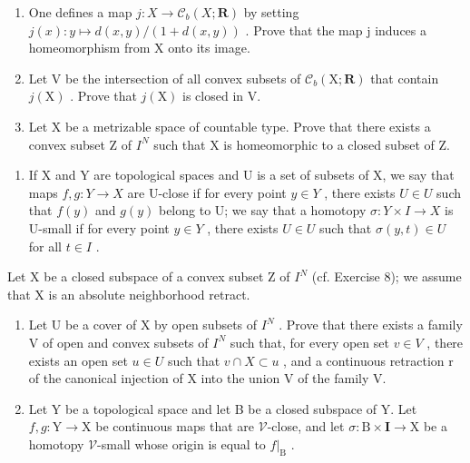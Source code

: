 \begin{enumerate}
\def\labelenumi{\alph{enumi})}
\item
  One defines a map \(j\colon X \to \mathcal{C}_{b}(X; \mathbf{R})\) by setting \(j(x)\colon y \mapsto d(x, y)/(1 + d(x, y))\) . Prove that the map j induces a homeomorphism from X onto its image.
\item
  Let V be the intersection of all convex subsets of \(\mathcal{C}_{b}(\mathrm{X};\mathbf{R})\) that contain \(j(\mathrm{X})\) . Prove that \(j(\mathrm{X})\) is closed in V.
\item
  Let X be a metrizable space of countable type. Prove that there exists a convex subset Z of \(I^{N}\) such that X is homeomorphic to a closed subset of Z.
\end{enumerate}

\begin{enumerate}
\def\labelenumi{\arabic{enumi})}
\setcounter{enumi}{8}
\tightlist
\item
  If X and Y are topological spaces and U is a set of subsets of X, we say that maps \(f, g: Y \to X\) are U-close if for every point \(y \in Y\) , there exists \(U \in U\) such that \(f(y)\) and \(g(y)\) belong to U; we say that a homotopy \(\sigma: Y \times I \to X\) is U-small if for every point \(y \in Y\) , there exists \(U \in U\) such that \(\sigma(y, t) \in U\) for all \(t \in I\) .
\end{enumerate}

Let X be a closed subspace of a convex subset Z of \(I^{N}\) (cf. Exercise 8); we assume that X is an absolute neighborhood retract.

\begin{enumerate}
\def\labelenumi{\alph{enumi})}
\item
  Let U be a cover of X by open subsets of \(I^{N}\) . Prove that there exists a family V of open and convex subsets of \(I^{N}\) such that, for every open set \(v \in V\) , there exists an open set \(u \in U\) such that \(v \cap X \subset u\) , and a continuous retraction r of the canonical injection of X into the union V of the family V.
\item
  Let Y be a topological space and let B be a closed subspace of Y. Let \(f, g: \mathrm{Y} \to \mathrm{X}\) be continuous maps that are \(\mathcal{V}\)-close, and let \(\sigma: \mathrm{B} \times \mathbf{I} \to \mathrm{X}\) be a homotopy \(\mathcal{V}\)-small whose origin is equal to \(f|_{\mathrm{B}}\) .
\end{enumerate}


